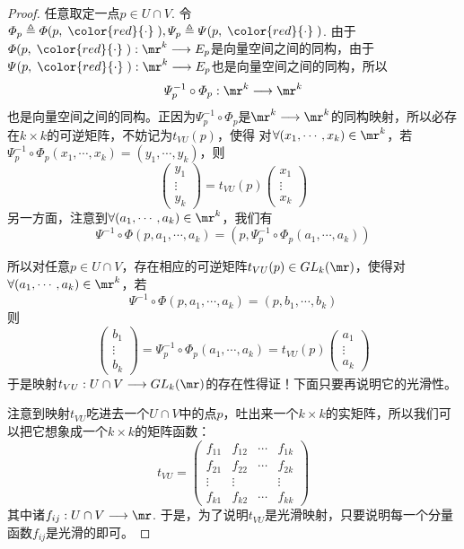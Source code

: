 \begin{proof}
	任意取定一点$p\in U\cap V$. 令$\varPhi_{p}\triangleq\varPhi(p,\;{\color{red}{\cdot}}\;),\varPsi_{p}\triangleq\varPsi(p,\;{\color{red}{\cdot}}\;)$. 由于$\varPhi(p,\;{\color{red}{\cdot}}\;): \mr^{k}\longrightarrow E_{p}$是向量空间之间的同构，由于$\varPsi(p,\;{\color{red}{\cdot}}\;): \mr^{k}\longrightarrow E_{p}$也是向量空间之间的同构，所以
	\[
	\varPsi^{-1}_{p}\circ\varPhi_{p}:\mr^{k}\longrightarrow \mr^{k}
	\]
	也是向量空间之间的同构。正因为$\varPsi^{-1}_{p}\circ\varPhi_{p}$是$\mr^{k}\longrightarrow \mr^{k}$的同构映射，所以必存在$k\times k$的可逆矩阵，不妨记为$t_{VU}(p)$，使得
	对$\forall(x_{1},\cdots,x_{k})\in \mr^{k}$，若$\varPsi^{-1}_{p}\circ\varPhi_{p}(x_{1},\cdots,x_{k})=(y_{1},\cdots,y_{k})$，则
	\[
	\left( \begin{array}{ccc}{y_{1}} \\ {\vdots}  \\ {y_{k}} \end{array}\right)=t_{VU}(p) \left( \begin{array}{ccc}{x_{1}} \\ {\vdots}  \\ {x_{k}}\end{array}\right)
	\]
    另一方面，注意到$\forall(a_{1},\cdots,a_{k})\in \mr^{k}$，我们有
	\[
	\varPsi^{-1}\circ\varPhi(p,a_{1},\cdots,a_{k})=(p,	\varPsi^{-1}_{p}\circ\varPhi_{p}(a_{1},\cdots,a_{k}))
	\]
	
	所以对任意$p\in U\cap V$，存在相应的可逆矩阵$t_{VU}(p)\in GL_{k}(\mr)$，使得对$\forall(a_{1},\cdots,a_{k})\in \mr^{k}$，若
	\[
	\varPsi^{-1}\circ\varPhi(p,a_{1},\cdots,a_{k})=(p,b_{1},\cdots,b_{k})
	\]
	则
	\[
	\left( \begin{array}{ccc}{b_{1}} \\ {\vdots}  \\ {b_{k}} \end{array}\right)=\varPsi^{-1}_{p}\circ\varPhi_{p}(a_{1},\cdots,a_{k})=t_{VU}(p) \left( \begin{array}{ccc}{a_{1}} \\ {\vdots}  \\ {a_{k}} \end{array}\right)
	\]
	于是映射$t_{VU}:U\cap V\longrightarrow GL_{k}(\mr)$的存在性得证！下面只要再说明它的光滑性。
	
	注意到映射$t_{VU}$吃进去一个$U\cap V$中的点$p$，吐出来一个$k\times k$的实矩阵，所以我们可以把它想象成一个$k\times k$的矩阵函数：
	\[
	t_{VU}=\left( \begin{array}{cccc}{f_{11}} & {f_{12}} & {\cdots} & {f_{1 k}} \\ {f_{21}} & {f_{22}} & {\cdots} & {f_{2 k}} \\ {\vdots} & {\vdots} & { } & {\vdots} \\ {f_{k 1}} & {f_{k 2}} & {\cdots} & {f_{kk}}\end{array}\right)
	\]
	其中诸$f_{ij}:U\cap V\longrightarrow \mr$. 于是，为了说明$t_{VU}$是光滑映射，只要说明每一个分量函数$f_{ij}$是光滑的即可。
	

\end{proof}
